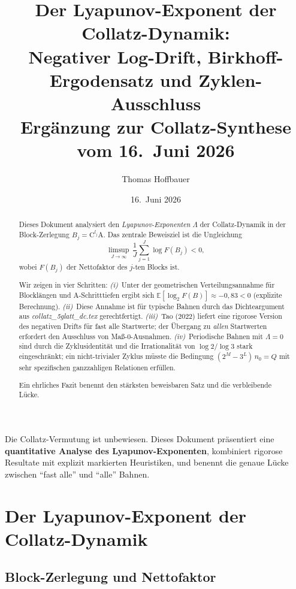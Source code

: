 \documentclass[12pt,a4paper]{article}
\title{%
  Der Lyapunov-Exponent der Collatz-Dynamik:\\[0.3em]
  Negativer Log-Drift, Birkhoff-Ergodensatz und Zyklen-Ausschluss\\[0.5em]
  \large Ergänzung zur Collatz-Synthese vom 16.\ Juni 2026%
}
\author{Thomas Hoffbauer}
\date{16.\ Juni 2026}
\newcommand{\E}{\mathbb{E}}
\begin{document}
\maketitle

\begin{abstract}
Dieses Dokument analysiert den \emph{Lyapunov-Exponenten} $\Lambda$ der
Collatz-Dynamik in der Block-Zerlegung $B_j = \mathrm{C}^{l_j}\mathrm{A}$.
Das zentrale Beweisziel ist die Ungleichung
\[
  \limsup_{J\to\infty}\,\frac{1}{J}\sum_{j=1}^{J}\log F(B_j) < 0,
\]
wobei $F(B_j)$ der Nettofaktor des $j$-ten Blocks ist.

Wir zeigen in vier Schritten: \emph{(i)}~Unter der geometrischen
Verteilungsannahme für Blocklängen und A-Schritttiefen ergibt sich
$\E[\log_2 F(B)] \approx -0{,}83 < 0$ (explizite Berechnung).
\emph{(ii)}~Diese Annahme ist für typische Bahnen durch das
Dichteargument aus \textit{collatz\_5glatt\_dc.tex} gerechtfertigt.
\emph{(iii)}~Tao (2022) liefert eine rigorose Version des negativen Drifts
für fast alle Startwerte; der Übergang zu \emph{allen} Startwerten erfordert
den Ausschluss von Maß-0-Ausnahmen.
\emph{(iv)}~Periodische Bahnen mit $\Lambda = 0$ sind durch die
Zyklusidentität und die Irrationalität von $\log 2/\log 3$ stark eingeschränkt;
ein nicht-trivialer Zyklus müsste die Bedingung
$(2^M - 3^L)\,n_0 = Q$ mit sehr spezifischen ganzzahligen Relationen erfüllen.

Ein ehrliches Fazit benennt den stärksten beweisbaren Satz und die
verbleibende Lücke.
\end{abstract}

\tableofcontents

\bigskip
\begin{tcolorbox}[warnung, title={Einordnung}]
Die Collatz-Vermutung ist unbewiesen. Dieses Dokument präsentiert eine
\textbf{quantitative Analyse des Lyapunov-Exponenten}, kombiniert rigorose
Resultate mit explizit markierten Heuristiken, und benennt die genaue Lücke
zwischen ``fast alle'' und ``alle'' Bahnen.
\end{tcolorbox}

\section{Der Lyapunov-Exponent der Collatz-Dynamik}
\label{sec:lyapunov}

\subsection{Block-Zerlegung und Nettofaktor}
\end{document}
